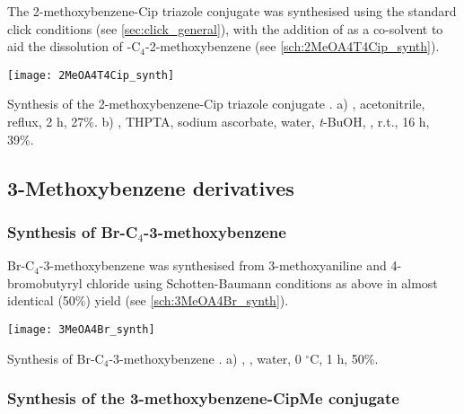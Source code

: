 The 2-methoxybenzene-Cip triazole conjugate  was synthesised using the standard click conditions  (see \ref{sec:click_general}), with the addition of  as a co-solvent to aid the dissolution of -C$_4$-2-methoxybenzene  (see \ref{sch:2MeOA4T4Cip_synth}).

\begin{scheme}[H]
	\begin{center}
				\texttt{[image: 2MeOA4T4Cip\_synth]}
		\caption{Synthesis of the 2-methoxybenzene-Cip triazole conjugate . 
		a) , acetonitrile, reflux, 2 h, 27\%. 
		b) , THPTA, sodium ascorbate, water, \textit{t}-BuOH, , r.t., 16 h, 39\%.\label{sch:2MeOA4T4Cip_synth}}
	\end{center}
\end{scheme}

\subsection{3-Methoxybenzene derivatives}

\subsubsection{Synthesis of Br-C$_4$-3-methoxybenzene }

Br-C$_4$-3-methoxybenzene  was synthesised from 3-methoxyaniline  and 4-bromobutyryl chloride  using Schotten-Baumann conditions as above in almost identical (50\%) yield (see \ref{sch:3MeOA4Br_synth}). 

\begin{scheme}[H]
	\begin{center}
		\texttt{[image: 3MeOA4Br\_synth]}
		\caption{Synthesis of Br-C$_4$-3-methoxybenzene .
			a) , , water, 0 $^{\circ}$C, 1 h, 50\%. \label{sch:3MeOA4Br_synth}}
	\end{center}
\end{scheme}

\subsubsection{Synthesis of the 3-methoxybenzene-CipMe conjugate }

